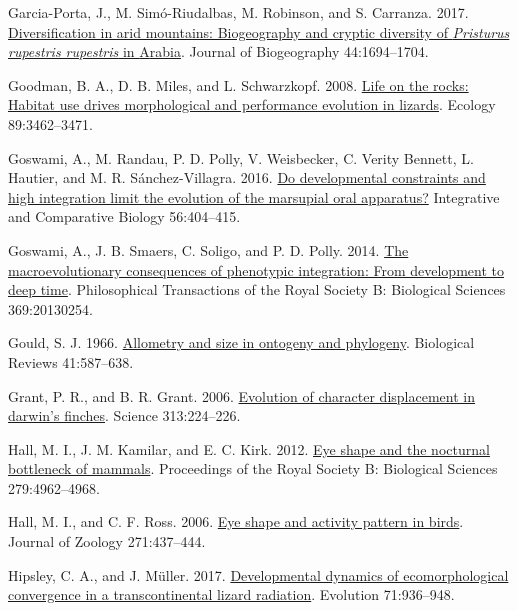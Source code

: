 \documentclass[
  11pt,
]{article}
\newlength{\cslhangindent}
\newlength{\cslentryspacingunit} %
\newenvironment{CSLReferences}[2] %
 {%
  \setlength{\parindent}{0pt}
  \ifodd #1
  \let\oldpar\par
  \def\par{\hangindent=\cslhangindent\oldpar}
  \fi
  \setlength{\parskip}{#2\cslentryspacingunit}
 }%
 {}
\begin{document}
\begin{CSLReferences}{1}{0}
\leavevmode{}%
Garcia-Porta, J., M. Simó-Riudalbas, M. Robinson, and S. Carranza. 2017.
\href{https://doi.org/10.1111/jbi.12929}{Diversification in arid
mountains: Biogeography and cryptic diversity of \emph{{P}risturus
rupestris rupestris} in {A}rabia}. Journal of Biogeography
44:1694--1704.

\leavevmode{}%
Goodman, B. A., D. B. Miles, and L. Schwarzkopf. 2008.
\href{https://doi.org/10.1890/07-2093.1}{{Life on the rocks: Habitat use
drives morphological and performance evolution in lizards}}. Ecology
89:3462--3471.

\leavevmode{}%
Goswami, A., M. Randau, P. D. Polly, V. Weisbecker, C. Verity Bennett,
L. Hautier, and M. R. Sánchez-Villagra. 2016.
\href{https://doi.org/10.1093/icb/icw039}{Do developmental constraints
and high integration limit the evolution of the marsupial oral
apparatus?} Integrative and Comparative Biology 56:404--415.

\leavevmode{}%
Goswami, A., J. B. Smaers, C. Soligo, and P. D. Polly. 2014.
\href{https://doi.org/10.1098/rstb.2013.0254}{The macroevolutionary
consequences of phenotypic integration: From development to deep time}.
Philosophical Transactions of the Royal Society B: Biological Sciences
369:20130254.

\leavevmode{}%
Gould, S. J. 1966.
\href{https://doi.org/10.1111/j.1469-185x.1966.tb01624.x}{Allometry and
size in ontogeny and phylogeny}. Biological Reviews 41:587--638.

\leavevmode{}%
Grant, P. R., and B. R. Grant. 2006.
\href{https://doi.org/10.1126/science.1128374}{Evolution of character
displacement in darwin's finches}. Science 313:224--226.

\leavevmode{}%
Hall, M. I., J. M. Kamilar, and E. C. Kirk. 2012.
\href{https://doi.org/10.1098/rspb.2012.2258}{Eye shape and the
nocturnal bottleneck of mammals}. Proceedings of the Royal Society B:
Biological Sciences 279:4962--4968.

\leavevmode{}%
Hall, M. I., and C. F. Ross. 2006.
\href{https://doi.org/10.1111/j.1469-7998.2006.00227.x}{Eye shape and
activity pattern in birds}. Journal of Zoology 271:437--444.

\leavevmode{}%
Hipsley, C. A., and J. Müller. 2017.
\href{https://doi.org/10.1111/evo.13186}{{Developmental dynamics of
ecomorphological convergence in a transcontinental lizard radiation}}.
Evolution 71:936--948.


\end{CSLReferences}
\end{document}
